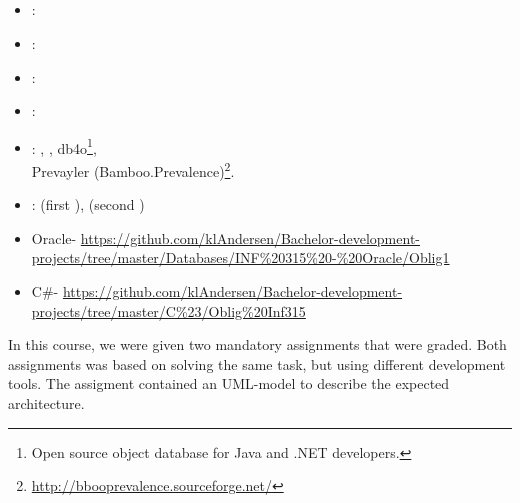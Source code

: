 \label{sec:section2}


\subsection[Management of Databases]{}
\label{sec:inf313_real_estate}
\begin{itemize} 
	\item {}: 
	\item {}: 
	\item {}: 
	\item {}: 
	\item {}: , , db4o\footnote{
		Open source object database for Java and .NET developers.
	}, \\ Prevayler (Bamboo.Prevalence)\footnote{\url{http://bbooprevalence.sourceforge.net/}}.	
	\item {}:  (first ),  (second )
	\item Oracle- \url{https://github.com/klAndersen/Bachelor-development-projects/tree/master/Databases/INF%20315%20-%20Oracle/Oblig1}
	\item C\#- \url{https://github.com/klAndersen/Bachelor-development-projects/tree/master/C%23/Oblig%20Inf315}
\end{itemize} 
In this course, we were given two mandatory assignments that were graded. 
Both assignments was based on solving the same task, but using different development tools.
The assigment contained an UML-model to describe the expected architecture.


